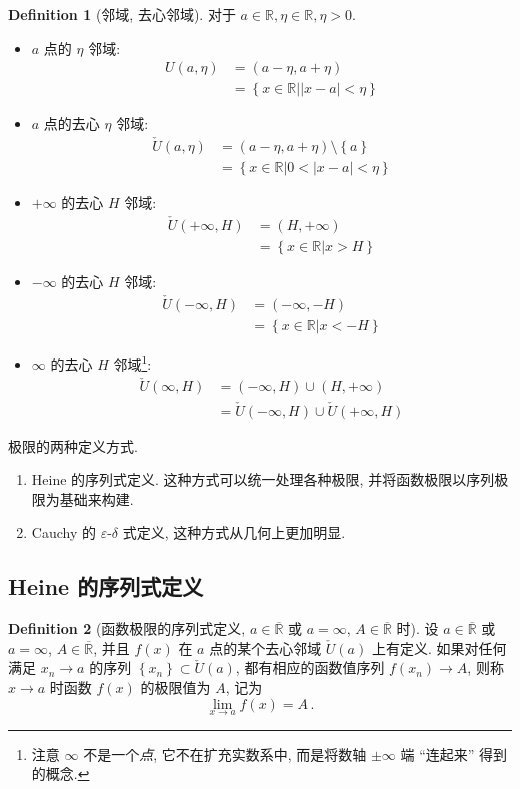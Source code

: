 \documentclass{book}
\newcommand{\union}{\cup}
\newcommand{\set}[1]{\left\{#1\right\}}
\newcommand{\openinterval}[1]{\left( #1 \right)}
\newcommand{\exR}{\overline{\mathbb{R}}}
\newcommand{\abs}[1]{\left\lvert #1 \right\rvert}
\newcommand{\R}{\mathbb{R}}
\newcommand{\puncU}[1]{\check{U}\!\left( #1 \right)}
\numberwithin{equation}{section}
\numberwithin{figure}{section}
\theoremstyle{definition}
\newtheorem{definition}{Definition}
\newcommand{\dq}[1]{``#1''}
\begin{document}
\begin{definition}[邻域, 去心邻域]
  对于 $a\in\R,\eta\in\R,\eta>0$.
  \begin{itemize}
    \item $a$ 点的 $\eta$ 邻域:
      \begin{align*}
	U(a,\eta)&=\openinterval{a-\eta,a+\eta}\\
		 &=\set{x\in\R|\abs{x-a}<\eta}
      \end{align*}
    \item $a$ 点的去心 $\eta$ 邻域:
      \begin{align*}
	\puncU{a,\eta}&=\openinterval{a-\eta,a+\eta}\setminus\set{a}\\
				 &=\set{x\in\R|0<\abs{x-a}<\eta}
      \end{align*}
    \item $+\infty$ 的去心 $H$ 邻域:
      \begin{align*}
	\puncU{+\infty,H}&=\openinterval{H,+\infty}\\
	&=\set{x\in\R|x>H}
      \end{align*}
    \item $-\infty$ 的去心 $H$ 邻域:
      \begin{align*}
	\puncU{-\infty,H}&=\openinterval{-\infty,-H}\\
	&=\set{x\in\R|x<-H}
      \end{align*}
    \item $\infty$ 的去心 $H$ 邻域\footnote{注意 $\infty$ 不是一个\emph{点}, 它不在扩充实数系中, 而是将数轴 $\pm\infty$ 端 \dq{连起来} 得到的概念.}:
      \begin{align*}
	\puncU{\infty,H}&=(-\infty,H)\union(H,+\infty)\\
	&=\puncU{-\infty,H}\union\puncU{+\infty,H}
      \end{align*}
  \end{itemize}
\end{definition}

极限的两种定义方式.
\begin{enumerate}
  \item Heine 的序列式定义. 这种方式可以统一处理各种极限, 并将函数极限以序列极限为基础来构建.
  \item Cauchy 的 $\varepsilon$-$\delta$ 式定义, 这种方式从几何上更加明显.
\end{enumerate}

\subsection{Heine 的序列式定义}
\begin{definition}[函数极限的序列式定义, $a\in\exR$ 或 $a=\infty$, $A\in\exR$ 时]
  \leavevmode

  设 $a\in\exR$ 或 $a=\infty$, $A\in\exR$, 并且 $f(x)$ 在 $a$ 点的某个去心邻域 $\puncU{a}$ 上有定义. 如果对任何满足 $x_n\to a$ 的序列 $\set{x_n}\subset\puncU{a}$, 都有相应的函数值序列 $f(x_n)\to A$, 则称 $x\to a$ 时函数 $f(x)$ 的极限值为 $A$, 记为
  \begin{equation*}
    \lim_{x\to a}f(x)=A\,.
  \end{equation*}
\end{definition}
\end{document}

